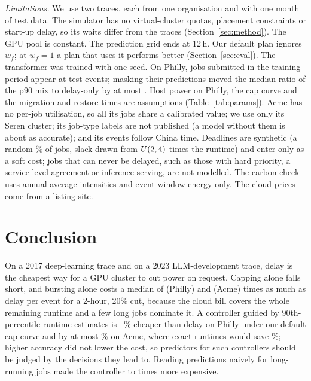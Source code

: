 \emph{Limitations.} We use two traces, each from one organisation and with one month of test data. The simulator has no virtual-cluster quotas, placement constraints or start-up delay, so its waits differ from the traces (Section~\ref{sec:method}). The GPU pool is constant. The prediction grid ends at 12\,h. Our default plan ignores $w_f$; at $w_f=1$ a plan that uses it performs better (Section~\ref{sec:eval}). The transformer was trained with one seed. On Philly, jobs submitted in the training period appear at test events; masking their predictions moved the median ratio of the p90 mix to delay-only by at most \LearnedMaskShiftMax{}. Host power on Philly, the cap curve and the migration and restore times are assumptions (Table~\ref{tab:params}). Acme has no per-job utilisation, so all its jobs share a calibrated value; we use only its Seren cluster; its job-type labels are not published (a model without them is about as accurate); and its events follow China time. Deadlines are synthetic (a random \DeadlineSharePct\% of jobs, slack drawn from $U(2,4)$ times the runtime) and enter only as a soft cost; jobs that can never be delayed, such as those with hard priority, a service-level agreement or inference serving, are not modelled. The carbon check uses annual average intensities and event-window energy only. The cloud prices come from a listing site.

\section{Conclusion}
\label{sec:conclusion}

On a 2017 deep-learning trace and on a 2023 LLM-development trace, delay is the cheapest way for a GPU cluster to cut power on request. Capping alone falls short, and bursting alone costs a median of \BurstOverDelayDefaultZero{} (Philly) and \AcmeBurstOverDelayDefaultZero{} (Acme) times as much as delay per event for a 2-hour, 20\% cut, because the cloud bill covers the whole remaining runtime and a few long jobs dominate it. A controller guided by 90th-percentile runtime estimates is \LearnedGainMinPct{}--\LearnedGainMaxPct\% cheaper than delay on Philly under our default cap curve and by at most \AcmeLearnedMixGainMaxPct\% on Acme, where exact runtimes would save \AcmeOracleMixGainPctZero\%; higher accuracy did not lower the cost, so predictors for such controllers should be judged by the decisions they lead to. Reading predictions naively for long-running jobs made the controller \ContractOverHoldMin{} to \ContractOverHoldMax{} times more expensive.
